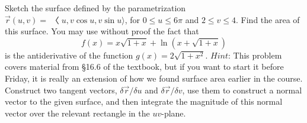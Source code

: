 \documentclass[12pt]{exam}
\begin{document}
\begin{questions}
\question Sketch the surface defined by the parametrization $\overrightarrow{r} (u, v) = 〈u, v \cos u, v \sin u \rangle$, for $0 \leq u \leq 6\pi$ and $2 \leq v \leq 4$. Find the area of this surface. You may use without proof the fact that
\[f (x) = x\sqrt{1 + x} + \ln(x + \sqrt{1 + x})\]
is the antiderivative of the function $g(x) = 2\sqrt{1 + x^2}$. $Hint$: This problem covers material from §16.6 of the textbook, but if you want to start it before Friday, it is really an extension of how we found surface area earlier in the course. Construct two tangent vectors, $\delta \overrightarrow{r} / \delta u$ and $\delta \overrightarrow{r} / \delta v$, use them to construct a normal vector to the given surface, and then integrate the magnitude of this normal vector over the relevant rectangle in the $uv$-plane.

\end{questions}
\end{document}
